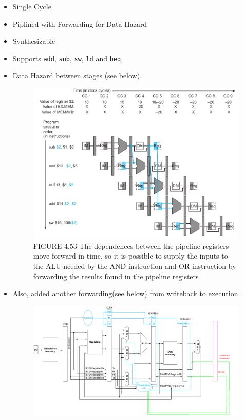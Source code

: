 \documentclass{article}
\begin{document}
\begin{itemize}
    \item Single Cycle
    \item Piplined with Forwarding for Data Hazard
    \item Synthesizable
    \item Supports \verb|add|, \verb|sub|, \verb|sw|, \verb|ld| and \verb|beq|.
    \item Data Hazard between stages (see below).
          \begin{figure}[H]
              \begin{center}
                  \includegraphics[scale=0.5]{PipelinedImplementation2/PipelineingEg.png}
                  \caption*{FIGURE 4.53 The dependences between the pipeline registers move forward in time, so it is possible to supply the inputs to the ALU needed by the AND instruction and OR instruction by forwarding the results found in the pipeline registers}
              \end{center}
          \end{figure}
    \item Also, added another forwarding(see below) from writeback to execution.
          \begin{figure}[H]
              \begin{center}
                  \includegraphics[scale=0.35]{PipelinedImplementation2/PipelinedVersion_Forwarding_Mod.png}
              \end{center}
          \end{figure}
\end{itemize}
\end{document}
